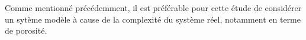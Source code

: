 Comme mentionné précédemment, il est préférable pour cette étude de considérer un sytème modèle à cause de la complexité du système réel, notamment en terme de porosité.

